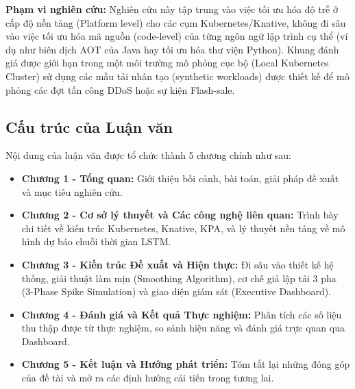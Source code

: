 \textbf{Phạm vi nghiên cứu:}
Nghiên cứu này tập trung vào việc tối ưu hóa độ trễ ở cấp độ nền tảng (Platform level) cho các cụm Kubernetes/Knative, không đi sâu vào việc tối ưu hóa mã nguồn (code-level) của từng ngôn ngữ lập trình cụ thể (ví dụ như biên dịch AOT của Java hay tối ưu hóa thư viện Python). Khung đánh giá được giới hạn trong một môi trường mô phỏng cục bộ (Local Kubernetes Cluster) sử dụng các mẫu tải nhân tạo (synthetic workloads) được thiết kế để mô phỏng các đợt tấn công DDoS hoặc sự kiện Flash-sale.

\subsection{Cấu trúc của Luận văn}
Nội dung của luận văn được tổ chức thành 5 chương chính như sau:
\begin{itemize}
    \item \textbf{Chương 1 - Tổng quan:} Giới thiệu bối cảnh, bài toán, giải pháp đề xuất và mục tiêu nghiên cứu.
    \item \textbf{Chương 2 - Cơ sở lý thuyết và Các công nghệ liên quan:} Trình bày chi tiết về kiến trúc Kubernetes, Knative, KPA, và lý thuyết nền tảng về mô hình dự báo chuỗi thời gian LSTM.
    \item \textbf{Chương 3 - Kiến trúc Đề xuất và Hiện thực:} Đi sâu vào thiết kế hệ thống, giải thuật làm mịn (Smoothing Algorithm), cơ chế giả lập tải 3 pha (3-Phase Spike Simulation) và giao diện giám sát (Executive Dashboard).
    \item \textbf{Chương 4 - Đánh giá và Kết quả Thực nghiệm:} Phân tích các số liệu thu thập được từ thực nghiệm, so sánh hiệu năng và đánh giá trực quan qua Dashboard.
    \item \textbf{Chương 5 - Kết luận và Hướng phát triển:} Tóm tắt lại những đóng góp của đề tài và mở ra các định hướng cải tiến trong tương lai.
\end{itemize}
